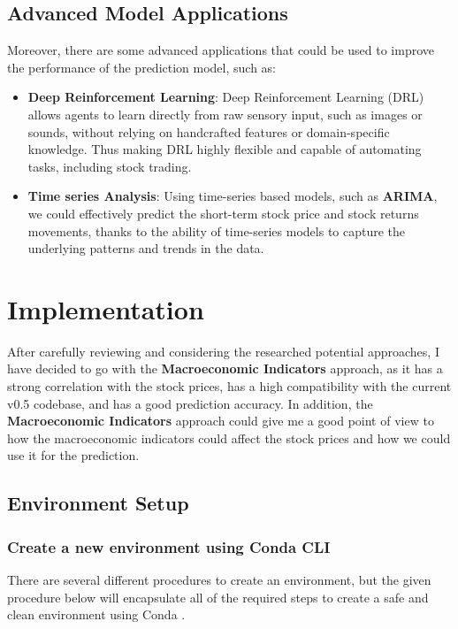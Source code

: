 \documentclass[11pt]{article}
\begin{document}
\subsection{Advanced Model Applications}
Moreover, there are some advanced applications that could be used to improve the performance of the prediction model, such as:
\begin{itemize}
   \item \textbf{Deep Reinforcement Learning}: Deep Reinforcement Learning (DRL) allows agents to learn directly from raw sensory input, such as images or sounds, without relying on handcrafted features or domain-specific knowledge.
   Thus making DRL highly flexible and capable of automating tasks, including stock trading. \cite{Khan2023-zu}
   \item \textbf{Time series Analysis}: Using time-series based models, such as \textbf{ARIMA}, we could effectively predict the short-term stock price and stock returns movements, thanks to the ability of time-series models to
   capture the underlying patterns and trends in the data. \cite{Hardikkumar2021-ry}
\end{itemize}
\section{Implementation}
After carefully reviewing and considering the researched potential approaches, I have decided to go with the \textbf{Macroeconomic Indicators} approach, as it has a strong correlation with the stock prices, has a high compatibility with the current v0.5 codebase, and has a good prediction accuracy.
In addition, the \textbf{Macroeconomic Indicators} approach could give me a good point of view to how the macroeconomic indicators could affect the stock prices and how we could use it for the prediction.
\subsection{Environment Setup}
\subsubsection{Create a new environment using Conda CLI}
There are several different procedures to create an environment, but the given procedure below will encapsulate all of the required steps to create a safe and clean environment using Conda \citep{Nti2019-lc}.

\end{document}
